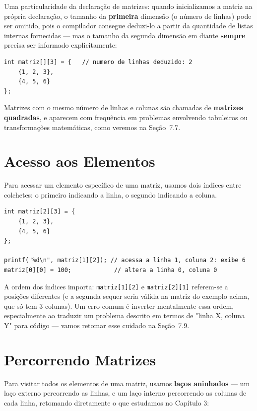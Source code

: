 \documentclass[12pt,a4paper,oneside]{extreport}
\begin{document}
Uma particularidade da declaração de matrizes: quando inicializamos a matriz na própria declaração, o tamanho da \textbf{primeira} dimensão (o número de linhas) pode ser omitido, pois o compilador consegue deduzi-lo a partir da quantidade de listas internas fornecidas — mas o tamanho da segunda dimensão em diante \textbf{sempre} precisa ser informado explicitamente:

\begin{lstlisting}
int matriz[][3] = {   // numero de linhas deduzido: 2
    {1, 2, 3},
    {4, 5, 6}
};
\end{lstlisting}

Matrizes com o mesmo número de linhas e colunas são chamadas de \textbf{matrizes quadradas}, e aparecem com frequência em problemas envolvendo tabuleiros ou transformações matemáticas, como veremos na Seção~7.7.

\section{Acesso aos Elementos}

Para acessar um elemento específico de uma matriz, usamos dois índices entre colchetes: o primeiro indicando a linha, o segundo indicando a coluna.

\begin{lstlisting}
int matriz[2][3] = {
    {1, 2, 3},
    {4, 5, 6}
};

printf("%d\n", matriz[1][2]); // acessa a linha 1, coluna 2: exibe 6
matriz[0][0] = 100;            // altera a linha 0, coluna 0
\end{lstlisting}

A ordem dos índices importa: \texttt{matriz[1][2]} e \texttt{matriz[2][1]} referem-se a posições diferentes (e a segunda sequer seria válida na matriz do exemplo acima, que só tem 3 colunas). Um erro comum é inverter mentalmente essa ordem, especialmente ao traduzir um problema descrito em termos de "linha X, coluna Y" para código — vamos retomar esse cuidado na Seção~7.9.

\section{Percorrendo Matrizes}

Para visitar todos os elementos de uma matriz, usamos \textbf{laços aninhados} — um laço externo percorrendo as linhas, e um laço interno percorrendo as colunas de cada linha, retomando diretamente o que estudamos no Capítulo 3:
\end{document}

